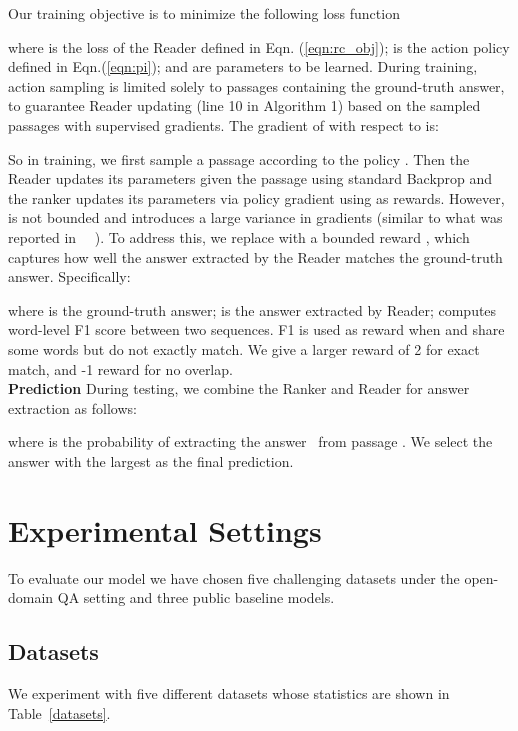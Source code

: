 \documentclass[letterpaper]{article} \usepackage{aaai18}  \usepackage{times}  \usepackage{helvet}  \usepackage{courier}  \usepackage{url}  \usepackage{graphicx}  \usepackage{comment}
\begin{document}
\begin{comment}

\end{comment}

Our training objective is to minimize the following loss function


where  is the loss of the Reader defined in Eqn. (\ref{eqn:rc_obj});  is the action policy defined in Eqn.(\ref{eqn:pi});  and  are parameters to be learned.
During training, action sampling is limited solely to passages containing the ground-truth answer, to guarantee Reader updating (line 10 in Algorithm 1) based on the sampled passages with supervised gradients. The gradient of  with respect to  is: 




So in training, we first sample a passage  according to the policy . Then the Reader updates its parameters given the passage  using standard Backprop and the ranker updates its parameters via policy gradient using  as rewards. However,  is not bounded and introduces a large variance in gradients (similar to what was reported in ~\citeauthor{mnih2014recurrent}~\citeyear{mnih2014recurrent}). To address this, we replace  with a bounded reward , which captures how well the answer extracted by the Reader matches the ground-truth answer.  Specifically:



where  is the ground-truth answer;  is the answer extracted by Reader;  computes
word-level F1 score between two sequences. F1 is used as reward when  and  share some words but do not exactly match. We give a larger reward of 2 for exact match, and -1 reward for no overlap. \\

\noindent\textbf{Prediction} \quad
During testing, we combine the Ranker and Reader for answer extraction as follows: 

where  is the probability of extracting the answer~ from passage . We select the answer with the largest  as the final prediction. 



\section{Experimental Settings}
To evaluate our model we have chosen five challenging datasets under the open-domain QA setting  and three public baseline models.

\subsection{Datasets}
We experiment with five different datasets whose statistics are shown in Table~\ref{datasets}.
\end{document}
